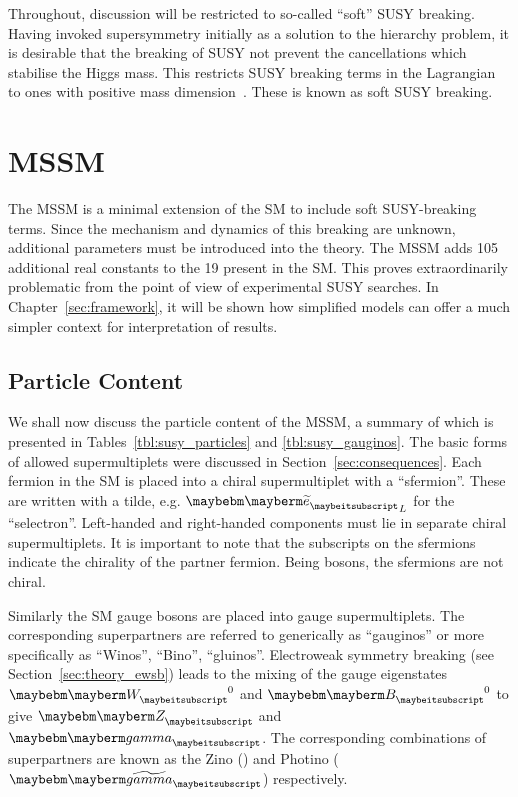 Throughout, discussion will be restricted to so-called ``soft'' \ac{SUSY}
breaking. Having invoked supersymmetry initially as a solution to the hierarchy
problem, it is desirable that the breaking of \ac{SUSY} not prevent the
cancellations which stabilise the Higgs mass. This restricts \ac{SUSY} breaking
terms in the Lagrangian to ones with positive mass
dimension~\cite{susy_primer}. These is known as soft \ac{SUSY} breaking.


\section{\acl{MSSM}}
\label{sec:susy_mssm}
The \acl{MSSM} is a minimal extension of the \ac{SM} to include soft
\ac{SUSY}-breaking terms. Since the mechanism and dynamics of this breaking are
unknown, additional parameters must be introduced into the theory. The \ac{MSSM}
adds 105 additional real constants to the 19 present in the \ac{SM}. This proves
extraordinarily problematic from the point of view of experimental \ac{SUSY}
searches. In Chapter~\ref{sec:framework}, it will be shown how simplified models
can offer a much simpler context for interpretation of results.

\subsection{Particle Content}
We shall now discuss the particle content of the \ac{MSSM}, a summary of which
is presented in Tables~\ref{tbl:susy_particles} and \ref{tbl:susy_gauginos}. The
basic forms of allowed supermultiplets were discussed in
Section~\ref{sec:consequences}. Each fermion in the \ac{SM} is placed into a
chiral supermultiplet with a \spinzero ``sfermion''. These are written with a
tilde, e.g. $\PSe_L$ for the ``selectron''. Left-handed and right-handed
components must lie in separate chiral supermultiplets. It is important to note
that the subscripts on the sfermions indicate the chirality of the partner
fermion. Being \spinzero bosons, the sfermions are not chiral.

Similarly the \ac{SM} gauge bosons are placed into gauge supermultiplets. The
corresponding superpartners are referred to generically as ``gauginos'' or more
specifically as ``Winos'', ``Bino'', ``gluinos''. Electroweak symmetry breaking
(see Section~\ref{sec:theory_ewsb}) leads to the mixing of the gauge eigenstates
$\PW^0$ and $\PB^0$ to give $\PZ$ and $\Pphoton$. The corresponding combinations
of superpartners are known as the Zino (\PSZ) and Photino ($\PSphotino$)
respectively.


